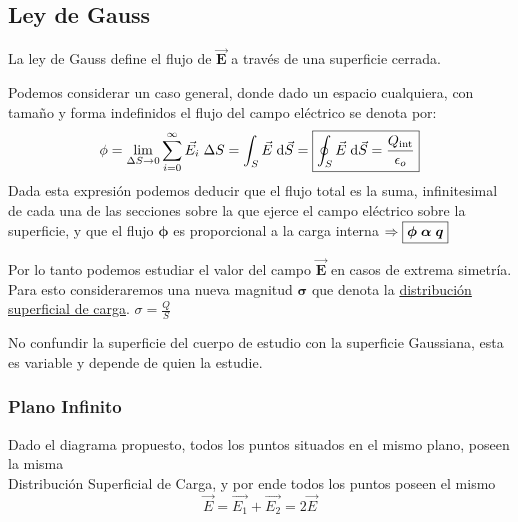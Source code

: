 \subsection{Ley de Gauss}
\begin{wrapfigure}{r}{3cm}
        
\end{wrapfigure}
\noindent La ley de Gauss define el flujo de \(\bm{\vec{E}}\) a través de una superficie cerrada.\par
\noindent Podemos considerar un caso general, donde dado un espacio cualquiera, con tamaño y forma indefinidos el flujo del campo eléctrico se denota por:
\[
        \phi =\lim_{\Delta S \to 0}\sum_{i=0}^{\infty}\vec{E_i}\hspace{1mm}\Delta S = \int_{S}\vec{E}\hspace{1mm}\mathrm{d} \vec{S} = \boxed{\oint_{S} \vec{E} \hspace{1mm}\mathrm{d} \vec{S} = \frac{Q_\textnormal{int}}{\epsilon_o}}
\]
Dada esta expresión podemos deducir que el flujo total es la suma, infinitesimal de cada una de las secciones sobre la que ejerce el campo eléctrico sobre la superficie, y que el flujo \(\bm{\phi}\) es proporcional a la carga interna \(\Rightarrow \boxed{\bm{\phi} \hspace{1mm} \bm{\alpha} \hspace{1mm} \bm{q}}\) \par
\vspace{1cm}
\hspace{-.5cm}
Por lo tanto podemos estudiar el valor del campo \(\bm{\vec{E}}\) en casos de extrema simetría.
Para esto consideraremos una nueva magnitud \(\bm{\sigma}\) que denota la \underline{distribución superficial de carga}. \(\boxed{\sigma = \frac{Q}{S}}\)
\par \vspace{.5cm} \hspace{-.5cm}No confundir la superficie del cuerpo de estudio con la superficie Gaussiana, esta es variable y depende de quien la estudie.
\subsubsection{Plano Infinito}
\par
\noindent Dado el diagrama propuesto, todos los puntos situados en el mismo plano, poseen la misma \\Distribución Superficial de Carga, y por ende todos los puntos poseen el mismo
\[\vec{E} = \vec{E_1} + \vec{E_2} = 2\vec{E}\]
